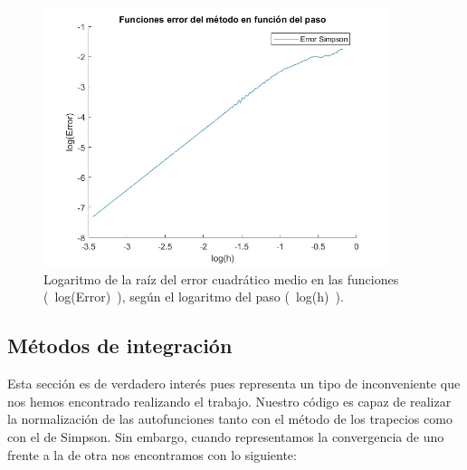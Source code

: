 \documentclass[12pt]{article}
\begin{document}
    \begin{figure}[H]
        \centering
        \includegraphics[width=0.9\textwidth]{errorfuncionsegunpasoN500log.jpg}
        \caption{Logaritmo de la raíz del error cuadrático medio en las funciones (~log(Error)~), según el  logaritmo del paso (~log(h)~).}
        \end{figure}  
        
    \subsection{Métodos de integración}

    Esta sección es de verdadero interés pues representa un tipo de inconveniente que nos hemos encontrado realizando el trabajo. Nuestro código es capaz de realizar la normalización de las autofunciones tanto con el método de los trapecios como con el de Simpson. Sin embargo, cuando representamos la convergencia de uno frente a la de otra nos encontramos con lo siguiente:
\end{document}
